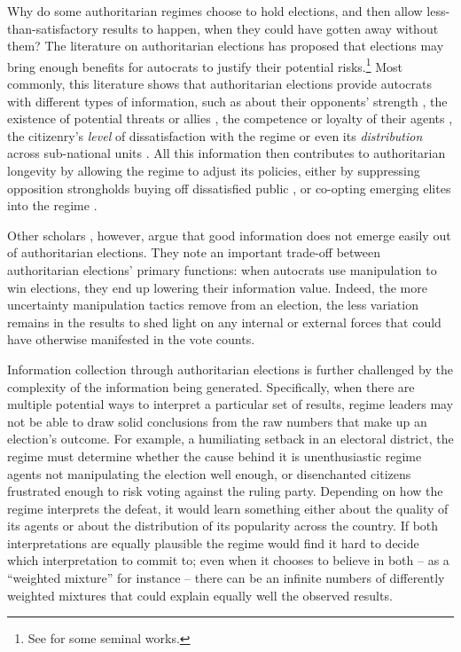\documentclass[12pt]{article}
\newcommand\fnote[1]{\footnote{\baselineskip=2\normalbaselineskip#1}}
\newcommand{\1}{\mathbbm{1}}
\begin{document}
Why do some authoritarian regimes choose to hold elections, and then allow less-than-satisfactory results to happen, when they could have gotten away without them? The literature on authoritarian elections has proposed that elections may bring enough benefits for autocrats to justify their potential risks.\fnote{See \citet{LustOkar2005, AR2005, Magaloni2006, Blaydes2010, Miller2015, Cox2009, Geddes2018} for some seminal works.} Most commonly, this literature shows that authoritarian elections provide autocrats with different types of information, such as about their opponents' strength \citep[][Ch. 6]{Geddes2018}, the existence of potential threats or allies \citep{LustOkar2005}, the competence or loyalty of their agents \citep{Magaloni2006, Blaydes2010, Myagkov2009, RundlettSvolik2016}, the citizenry's \textit{level} of dissatisfaction with the regime \citep{Miller2015} or even its \textit{distribution} across sub-national units \citep{Magaloni2006, Blaydes2010}. All this information then contributes to authoritarian longevity by allowing the regime to adjust its policies, either by suppressing opposition strongholds \citep{Magaloni2006, Blaydes2010} buying off dissatisfied public \citep{Miller2015, Magaloni2006}, or co-opting emerging elites into the regime \citep{LustOkar2005}.

Other scholars \citep[e.g.][]{Rozenas2016,Wintrobe2000, Morgenbesser2016}, however, argue that good information does not emerge easily out of authoritarian elections. They note an important trade-off between authoritarian elections' primary functions: when autocrats use manipulation to win elections, they end up lowering their information value. Indeed, the more uncertainty manipulation tactics remove from an election, the less variation remains in the results to shed light on any internal or external forces that could have otherwise manifested in the vote counts.

Information collection through authoritarian elections is further challenged by the complexity of the information being generated. Specifically, when there are multiple potential ways to interpret a particular set of results, regime leaders may not be able to draw solid conclusions from the raw numbers that make up an election's outcome. For example, a humiliating setback in an electoral district, the regime must determine whether the cause behind it is unenthusiastic regime agents not manipulating the election well enough, or disenchanted citizens frustrated enough to risk voting against the ruling party. Depending on how the regime interprets the defeat, it would learn something either about the quality of its agents or about the distribution of its popularity across the country. If both interpretations are equally plausible the regime would find it hard to decide which interpretation to commit to; even when it chooses to believe in both -- as a ``weighted mixture'' for instance -- there can be an infinite numbers of differently weighted mixtures that could explain equally well the observed results.
\end{document}
